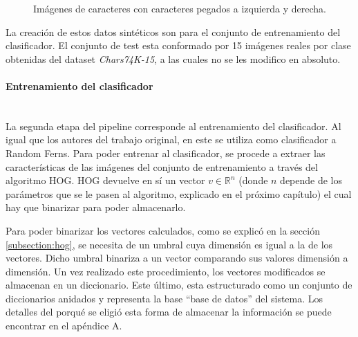 		\begin{figure}[htbp]
			\centering
			\caption[Caracteres pegados]{Imágenes de caracteres con caracteres pegados a izquierda y derecha.}
			\label{fig: Imagen anexos}
		\end{figure}

			La creación de estos datos sintéticos son para el conjunto de entrenamiento del clasificador. El conjunto de test esta conformado por 15 imágenes reales por clase obtenidas del dataset \textit{Chars74K-15}, a las cuales no se les modifico en absoluto.


		\paragraph{Entrenamiento del clasificador}  ~\\

			La segunda etapa del pipeline corresponde al entrenamiento del clasificador. Al igual que los autores del trabajo original, en este se utiliza como clasificador a Random Ferns. Para poder entrenar al clasificador, se procede a extraer las características de las imágenes del conjunto de entrenamiento a través del algoritmo HOG. HOG devuelve en sí un vector $v \in \mathbb{R}^{n}$ (donde $n$ depende de los parámetros que se le pasen al algoritmo, explicado en el próximo capítulo) el cual hay que binarizar para poder almacenarlo.

			Para poder binarizar los vectores calculados, como se explicó en la sección \ref{subsection:hog}, se necesita de un umbral cuya dimensión es igual a la de los vectores. Dicho umbral binariza a un vector comparando sus valores dimensión a dimensión. Un vez realizado este procedimiento, los vectores modificados se almacenan en un diccionario. Este último, esta estructurado como un conjunto de diccionarios anidados y representa la base ``base de datos'' del sistema. Los detalles del porqué se eligió esta forma de almacenar la información se puede encontrar en el apéndice A. 

